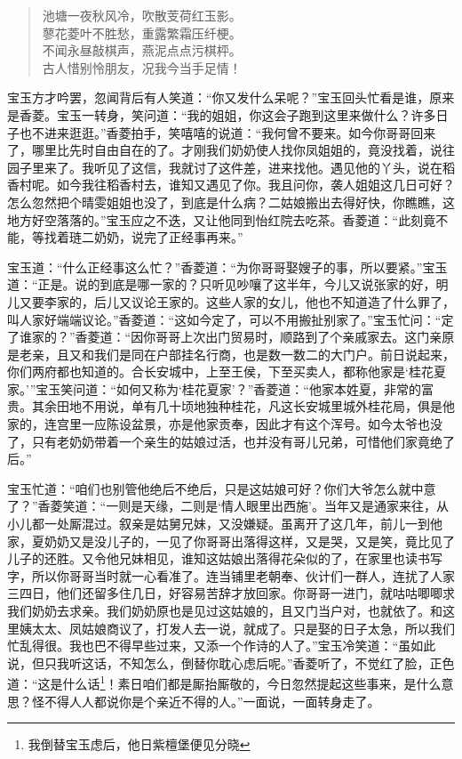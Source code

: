 \documentclass[12pt,oneside]{book}
\newenvironment{shici}{%
\begin{verse}%
\centering\large\hspace{12pt}}%
{\end{verse}}
\begin{document}
\begin{shici}
池塘一夜秋风冷，吹散芰荷红玉影。\\
蓼花菱叶不胜愁，重露繁霜压纤梗。\\
不闻永昼敲棋声，燕泥点点污棋枰。\\
古人惜别怜朋友，况我今当手足情！
\end{shici}


宝玉方才吟罢，忽闻背后有人笑道：“你又发什么呆呢？”宝玉回头忙看是谁，原来是香菱。宝玉一转身，笑问道：“我的姐姐，你这会子跑到这里来做什么？许多日子也不进来逛逛。”香菱拍手，笑嘻嘻的说道：“我何曾不要来。如今你哥哥回来了，哪里比先时自由自在的了。才刚我们奶奶使人找你凤姐姐的，竟没找着，说往园子里来了。我听见了这信，我就讨了这件差，进来找他。遇见他的丫头，说在稻香村呢。如今我往稻香村去，谁知又遇见了你。我且问你，袭人姐姐这几日可好？怎么忽然把个晴雯姐姐也没了，到底是什么病？二姑娘搬出去得好快，你瞧瞧，这地方好空落落的。”宝玉应之不迭，又让他同到怡红院去吃茶。香菱道：“此刻竟不能，等找着琏二奶奶，说完了正经事再来。”

宝玉道：“什么正经事这么忙？”香菱道：“为你哥哥娶嫂子的事，所以要紧。”宝玉道：“正是。说的到底是哪一家的？只听见吵嚷了这半年，今儿又说张家的好，明儿又要李家的，后儿又议论王家的。这些人家的女儿，他也不知道造了什么罪了，叫人家好端端议论。”香菱道：“这如今定了，可以不用搬扯别家了。”宝玉忙问：“定了谁家的？”香菱道：“因你哥哥上次出门贸易时，顺路到了个亲戚家去。这门亲原是老亲，且又和我们是同在户部挂名行商，也是数一数二的大门户。前日说起来，你们两府都也知道的。合长安城中，上至王侯，下至买卖人，都称他家是‘桂花夏家。’”宝玉笑问道：“如何又称为‘桂花夏家’？”香菱道：“他家本姓夏，非常的富贵。其余田地不用说，单有几十顷地独种桂花，凡这长安城里城外桂花局，俱是他家的，连宫里一应陈设盆景，亦是他家贡奉，因此才有这个浑号。如今太爷也没了，只有老奶奶带着一个亲生的姑娘过活，也并没有哥儿兄弟，可惜他们家竟绝了后。”

宝玉忙道：“咱们也别管他绝后不绝后，只是这姑娘可好？你们大爷怎么就中意了？”香菱笑道：“一则是天缘，二则是‘情人眼里出西施’。当年又是通家来往，从小儿都一处厮混过。叙亲是姑舅兄妹，又没嫌疑。虽离开了这几年，前儿一到他家，夏奶奶又是没儿子的，一见了你哥哥出落得这样，又是哭，又是笑，竟比见了儿子的还胜。又令他兄妹相见，谁知这姑娘出落得花朵似的了，在家里也读书写字，所以你哥哥当时就一心看准了。连当铺里老朝奉、伙计们一群人，连扰了人家三四日，他们还留多住几日，好容易苦辞才放回家。你哥哥一进门，就咕咕唧唧求我们奶奶去求亲。我们奶奶原也是见过这姑娘的，且又门当户对，也就依了。和这里姨太太、凤姑娘商议了，打发人去一说，就成了。只是娶的日子太急，所以我们忙乱得很。我也巴不得早些过来，又添一个作诗的人了。”宝玉冷笑道：“虽如此说，但只我听这话，不知怎么，倒替你耽心虑后呢。”香菱听了，不觉红了脸，正色道：“这是什么话\footnote{我倒替宝玉虑后，他日紫檀堡便见分晓}！素日咱们都是厮抬厮敬的，今日忽然提起这些事来，是什么意思？怪不得人人都说你是个亲近不得的人。”一面说，一面转身走了。
\end{document}
